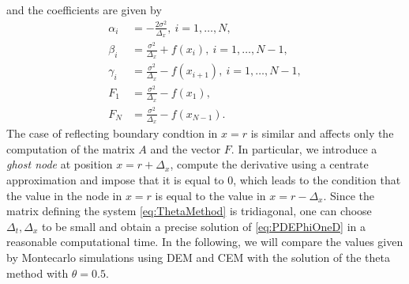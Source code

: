 and the coefficients are given by
\begin{equation}
\begin{split}
	\alpha_i &= -\frac{2\sigma^2}{\Delta_x}, \: i = 1, \dots, N, \\
	\beta_i  &= \frac{\sigma^2}{\Delta_x} + f(x_{i}), \: i = 1, \dots, N-1, \\
	\gamma_i &= \frac{\sigma^2}{\Delta_x} - f(x_{i+1}), \: i = 1, \dots, N-1, \\
	F_1      &= \frac{\sigma^2}{\Delta_x} - f(x_1), \\
	F_N      &= \frac{\sigma^2}{\Delta_x} - f(x_{N-1}).
\end{split}	
\end{equation}
The case of reflecting boundary condtion in $x = r$ is similar and affects only the computation of the matrix $A$ and the vector $F$. In particular, we introduce a \textit{ghost node} at position $x = r + \Delta_x$, compute the derivative using a centrate approximation and impose that it is equal to 0, which leads to the condition that the value in the node in $x = r$ is equal to the value in $x = r - \Delta_x$. Since the matrix defining the system \eqref{eq:ThetaMethod} is tridiagonal, one can choose $\Delta_t, \Delta_x$ to be small and obtain a precise solution of \eqref{eq:PDEPhiOneD} in a reasonable computational time. In the following, we will compare the values given by Montecarlo simulations using DEM and CEM with the solution of the theta method with $\theta = 0.5$.

 
